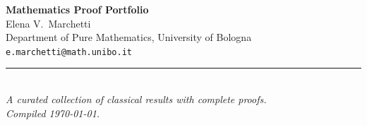 \documentclass[11pt, a4paper]{article}
\begin{document}
\begin{center}
  {\fontsize{22}{26}\selectfont\bfseries\color{accent}%
    Mathematics Proof Portfolio}\\[6pt]
  {\large\color{neutralgray} Elena V.\ Marchetti}\\[2pt]
  {\small\color{neutralgray}
    Department of Pure Mathematics, University of Bologna
    \quad\textbullet\quad
    \texttt{e.marchetti@math.unibo.it}}\\[8pt]
  {\color{rulecol}\rule{0.55\linewidth}{0.8pt}}\\[4pt]
  {\small\color{neutralgray}\itshape
    A curated collection of classical results with complete proofs.\\
    Compiled \today.}
\end{center}

\vspace{10pt}





\end{document}
